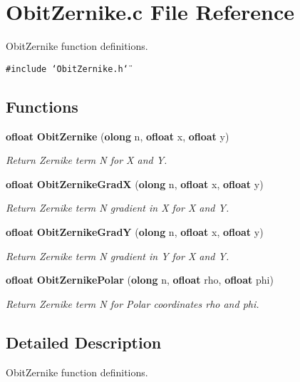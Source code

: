 \section{Obit\-Zernike.c File Reference}
\label{ObitZernike_8c}
Obit\-Zernike function definitions. 

{\tt \#include \char`\"{}Obit\-Zernike.h\char`\"{}}\par
\subsection*{Functions}
\begin{CompactItemize}
\item 
{\bf ofloat} {\bf Obit\-Zernike} ({\bf olong} n, {\bf ofloat} x, {\bf ofloat} y)
\begin{CompactList}\small\item\em Return Zernike term N for X and Y. \item\end{CompactList}\item 
{\bf ofloat} {\bf Obit\-Zernike\-Grad\-X} ({\bf olong} n, {\bf ofloat} x, {\bf ofloat} y)
\begin{CompactList}\small\item\em Return Zernike term N gradient in X for X and Y. \item\end{CompactList}\item 
{\bf ofloat} {\bf Obit\-Zernike\-Grad\-Y} ({\bf olong} n, {\bf ofloat} x, {\bf ofloat} y)
\begin{CompactList}\small\item\em Return Zernike term N gradient in Y for X and Y. \item\end{CompactList}\item 
{\bf ofloat} {\bf Obit\-Zernike\-Polar} ({\bf olong} n, {\bf ofloat} rho, {\bf ofloat} phi)
\begin{CompactList}\small\item\em Return Zernike term N for Polar coordinates rho and phi. \item\end{CompactList}\end{CompactItemize}


\subsection{Detailed Description}
Obit\-Zernike function definitions. 



